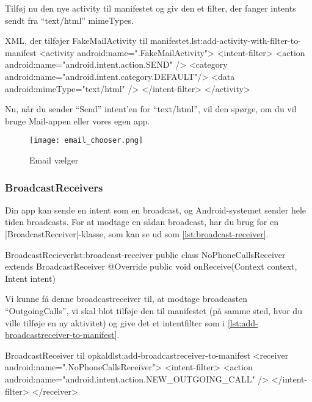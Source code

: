 Tilføj nu den nye activity til manifestet og giv den et filter, der fanger intents sendt fra ``text/html'' mimeTypes.

\begin{XmlCode}{XML, der tilføjer FakeMailActivity til manifestet.}{lst:add-activity-with-filter-to-manifest}
	<activity android:name=".FakeMailActivity">
		<intent-filter>
			<action android:name="android.intent.action.SEND" />
			<category android:name="android.intent.category.DEFAULT"/>
			<data android:mimeType="text/html" />
		</intent-filter>
	</activity>
\end{XmlCode}

Nu, når du sender ``Send'' intent'en for ``text/html'', vil den spørge, om du vil bruge Mail-appen eller vores egen app.

\begin{figure}[h]
	\begin{center}
		\texttt{[image: email\_chooser.png]}
		\caption{Email vælger}
		\label{fig:android:activities:email_chooser}
	\end{center}
\end{figure}

\subsubsection{BroadcastReceivers}

Din app kan sende en intent som en broadcast, og Android-systemet sender hele tiden broadcasts. For at modtage en sådan broadcast, har du brug for en \JavaInline|BroadcastReceiver|-klasse, som kan se ud som \autoref{lst:broadcast-receiver}.

\begin{JavaCode}{BroadcastReciever}{lst:broadcast-receiver}
	public class NoPhoneCallsReceiver extends BroadcastReceiver {
		@Override
		public void onReceive(Context context, Intent intent) {
		}
	}
\end{JavaCode}

Vi kunne få denne broadcastreceiver til, at modtage broadcasten ``OutgoingCalls'', vi skal blot tilføje den til manifestet (på samme sted, hvor du ville tilføje en ny aktivitet) og give det et intentfilter som i \autoref{lst:add-broadcastreceiver-to-manifest}.

\begin{XmlCode}{BroadcastReceiver til opkald}{lst:add-broadcastreceiver-to-manifest}
	<receiver android:name=".NoPhoneCallsReceiver">
		<intent-filter>
			<action android:name="android.intent.action.NEW_OUTGOING_CALL" />
		</intent-filter>
	</receiver>
\end{XmlCode}

